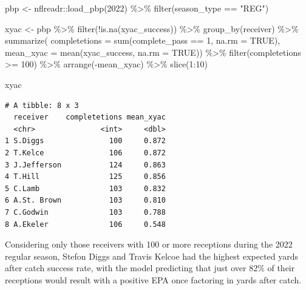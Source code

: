 \documentclass[
  letterpaper,
]{krantz}
\newenvironment{Shaded}{\begin{snugshade}}{\end{snugshade}}
\newcommand{\AttributeTok}[1]{\textcolor[rgb]{0.40,0.45,0.13}{#1}}
\newcommand{\ConstantTok}[1]{\textcolor[rgb]{0.56,0.35,0.01}{#1}}
\newcommand{\DecValTok}[1]{\textcolor[rgb]{0.68,0.00,0.00}{#1}}
\newcommand{\FunctionTok}[1]{\textcolor[rgb]{0.28,0.35,0.67}{#1}}
\newcommand{\NormalTok}[1]{\textcolor[rgb]{0.00,0.23,0.31}{#1}}
\newcommand{\OtherTok}[1]{\textcolor[rgb]{0.00,0.23,0.31}{#1}}
\newcommand{\SpecialCharTok}[1]{\textcolor[rgb]{0.37,0.37,0.37}{#1}}
\newcommand{\StringTok}[1]{\textcolor[rgb]{0.13,0.47,0.30}{#1}}
\begin{document}
\begin{Shaded}
\begin{Highlighting}[]
\NormalTok{pbp }\OtherTok{\textless{}{-}}\NormalTok{ nflreadr}\SpecialCharTok{::}\FunctionTok{load\_pbp}\NormalTok{(}\DecValTok{2022}\NormalTok{) }\SpecialCharTok{\%\textgreater{}\%}
  \FunctionTok{filter}\NormalTok{(season\_type }\SpecialCharTok{==} \StringTok{"REG"}\NormalTok{)}

\NormalTok{xyac }\OtherTok{\textless{}{-}}\NormalTok{ pbp }\SpecialCharTok{\%\textgreater{}\%}
  \FunctionTok{filter}\NormalTok{(}\SpecialCharTok{!}\FunctionTok{is.na}\NormalTok{(xyac\_success)) }\SpecialCharTok{\%\textgreater{}\%}
  \FunctionTok{group\_by}\NormalTok{(receiver) }\SpecialCharTok{\%\textgreater{}\%}
  \FunctionTok{summarize}\NormalTok{(}
    \AttributeTok{completetions =} \FunctionTok{sum}\NormalTok{(complete\_pass }\SpecialCharTok{==} \DecValTok{1}\NormalTok{, }\AttributeTok{na.rm =} \ConstantTok{TRUE}\NormalTok{),}
    \AttributeTok{mean\_xyac =} \FunctionTok{mean}\NormalTok{(xyac\_success, }\AttributeTok{na.rm =} \ConstantTok{TRUE}\NormalTok{)) }\SpecialCharTok{\%\textgreater{}\%}
  \FunctionTok{filter}\NormalTok{(completetions }\SpecialCharTok{\textgreater{}=} \DecValTok{100}\NormalTok{) }\SpecialCharTok{\%\textgreater{}\%}
  \FunctionTok{arrange}\NormalTok{(}\SpecialCharTok{{-}}\NormalTok{mean\_xyac) }\SpecialCharTok{\%\textgreater{}\%}
  \FunctionTok{slice}\NormalTok{(}\DecValTok{1}\SpecialCharTok{:}\DecValTok{10}\NormalTok{)}

\NormalTok{xyac}
\end{Highlighting}
\end{Shaded}

\begin{verbatim}
# A tibble: 8 x 3
  receiver    completetions mean_xyac
  <chr>               <int>     <dbl>
1 S.Diggs               100     0.872
2 T.Kelce               106     0.872
3 J.Jefferson           124     0.863
4 T.Hill                125     0.856
5 C.Lamb                103     0.832
6 A.St. Brown           103     0.810
7 C.Godwin              103     0.788
8 A.Ekeler              106     0.548
\end{verbatim}

Considering only those receivers with 100 or more receptions during the
2022 regular season, Stefon Diggs and Travis Kelcoe had the highest
expected yards after catch success rate, with the model predicting that
just over 82\% of their receptions would result with a positive EPA once
factoring in yards after catch.
\end{document}
